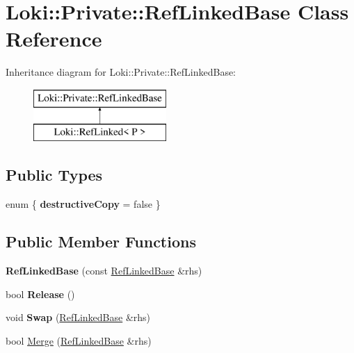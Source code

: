 \hypertarget{classLoki_1_1Private_1_1RefLinkedBase}{}\section{Loki\+:\+:Private\+:\+:Ref\+Linked\+Base Class Reference}
\label{classLoki_1_1Private_1_1RefLinkedBase}
Inheritance diagram for Loki\+:\+:Private\+:\+:Ref\+Linked\+Base\+:\begin{figure}[H]
\begin{center}
\leavevmode
\includegraphics[height=2.000000cm]{classLoki_1_1Private_1_1RefLinkedBase}
\end{center}
\end{figure}
\subsection*{Public Types}
\begin{DoxyCompactItemize}
\item 
\hypertarget{classLoki_1_1Private_1_1RefLinkedBase_a3b5b0cd79ee701f94f945eee2dcd5d36}{}enum \{ {\bfseries destructive\+Copy} = false
 \}\label{classLoki_1_1Private_1_1RefLinkedBase_a3b5b0cd79ee701f94f945eee2dcd5d36}

\end{DoxyCompactItemize}
\subsection*{Public Member Functions}
\begin{DoxyCompactItemize}
\item 
\hypertarget{classLoki_1_1Private_1_1RefLinkedBase_a79ac87ed0ccf8c7e8299d7177b34b261}{}{\bfseries Ref\+Linked\+Base} (const \hyperlink{classLoki_1_1Private_1_1RefLinkedBase}{Ref\+Linked\+Base} \&rhs)\label{classLoki_1_1Private_1_1RefLinkedBase_a79ac87ed0ccf8c7e8299d7177b34b261}

\item 
\hypertarget{classLoki_1_1Private_1_1RefLinkedBase_a4226c22472a2b092d1143801a06dc9b1}{}bool {\bfseries Release} ()\label{classLoki_1_1Private_1_1RefLinkedBase_a4226c22472a2b092d1143801a06dc9b1}

\item 
\hypertarget{classLoki_1_1Private_1_1RefLinkedBase_ab05d1c1d25013c63b33caad7358973b3}{}void {\bfseries Swap} (\hyperlink{classLoki_1_1Private_1_1RefLinkedBase}{Ref\+Linked\+Base} \&rhs)\label{classLoki_1_1Private_1_1RefLinkedBase_ab05d1c1d25013c63b33caad7358973b3}

\item 
bool \hyperlink{classLoki_1_1Private_1_1RefLinkedBase_ad0380e5d9d468c16b6e09caca818ff17}{Merge} (\hyperlink{classLoki_1_1Private_1_1RefLinkedBase}{Ref\+Linked\+Base} \&rhs)
\end{DoxyCompactItemize}


